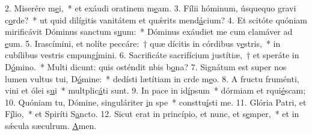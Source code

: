 2. Miserére m\uline{e}i,~* et exáudi oratinem m\uline{e}am.
3. Fílii hóminum, úsquequo gravi c\uline{o}rde?~* ut quid dilígitis vanitátem et quǽrits mend\uline{á}cium?
4. Et scitóte quóniam mirificávit Dóminus sanctum s\uline{u}um:~* Dóminus exáudiet me cum clamáver ad \uline{e}um.
5. Irascímini, et nolíte peccáre:~† quæ dícitis in córdibus v\uline{e}stris,~* in cubílibus vestris cmpung\uline{í}mini.
6. Sacrificáte sacrifícium justítiæ,~† et speráte in D\uline{ó}mino.~* Multi dicunt: quis osténdit nbis b\uline{o}na?
7. Signátum est super nos lumen vultus tui, D\uline{ó}mine:~* dedísti lætítiam in crde m\uline{e}o.
8. A fructu fruménti, vini et ólei s\uline{u}i~* multplic\uline{á}ti sunt.
9. In pace in id\uline{í}psum~* dórmiam et rqui\uline{é}scam;
10. Quóniam tu, Dómine, singuláriter \uline{i}n spe~* consttu\uline{í}sti me.
11. Glória Patri, et F\uline{í}lio,~* et Spiríti S\uline{a}ncto.
12. Sicut erat in princípio, et nunc, et s\uline{e}mper,~* et in sǽcula sæculrum. \uline{A}men.
